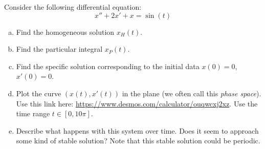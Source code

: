 \documentclass[12pt]{article} %
\begin{document}
\newpage
\begin{problem}
Consider the following differential equation:
\[
x''+2x'+x=\sin(t)
\]
\begin{enumerate}[(a)]
    \item Find the homogeneous solution $x_H(t)$.
    \item Find the particular integral $x_P(t)$.
    \item Find the specific solution corresponding to the initial data $x(0)=0$, $x'(0)=0$.
    \item Plot the curve $(x(t),x'(t))$ in the plane (we often call this \emph{phase space}). Use this link here: \url{https://www.desmos.com/calculator/ouqwcxj2xz}. Use the time range $t\in [0,10\pi]$.
    \item Describe what happens with this system over time. Does it seem to approach some kind of stable solution? Note that this stable solution could be periodic.
\end{enumerate}
\end{problem}
\end{document}
